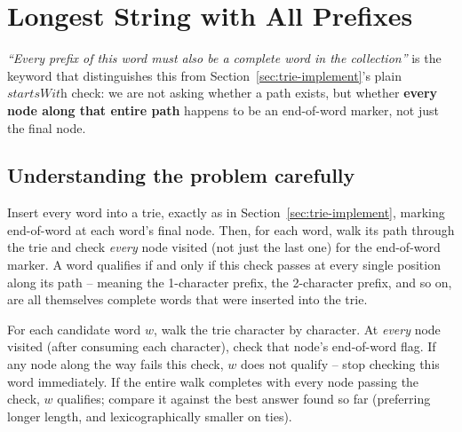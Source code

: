 \section{Longest String with All Prefixes}
\label{sec:trie-longest-word-prefixes}


\begin{patternbox}
\emph{``Every prefix of this word must also be a complete word in the
collection''} is the keyword that distinguishes this from
Section~\ref{sec:trie-implement}'s plain $\textit{startsWith}$ check: we
are not asking whether a path exists, but whether \textbf{every node
along that entire path} happens to be an end-of-word marker, not just the
final node.
\end{patternbox}

\subsection*{Understanding the problem carefully}

Insert every word into a trie, exactly as in
Section~\ref{sec:trie-implement}, marking end-of-word at each word's
final node. Then, for each word, walk its path through the trie and check
\emph{every} node visited (not just the last one) for the end-of-word
marker. A word qualifies if and only if this check passes at every
single position along its path -- meaning the 1-character prefix, the
2-character prefix, and so on, are all themselves complete words that
were inserted into the trie.

\begin{ideabox}
For each candidate word $w$, walk the trie character by character. At
\emph{every} node visited (after consuming each character), check that
node's end-of-word flag. If any node along the way fails this check, $w$
does not qualify -- stop checking this word immediately. If the entire
walk completes with every node passing the check, $w$ qualifies; compare
it against the best answer found so far (preferring longer length, and
lexicographically smaller on ties).
\end{ideabox}

